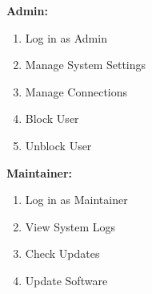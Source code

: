 \textbf{Admin:}
\begin{enumerate}
	\item  Log in as Admin
	\item Manage System Settings
	\item Manage Connections
	\item Block User
	\item Unblock User
\end{enumerate}

\textbf{Maintainer:}
\begin{enumerate}
	\item  Log in as Maintainer
	\item  View System Logs
	\item  Check Updates
	\item  Update Software
\end{enumerate}


